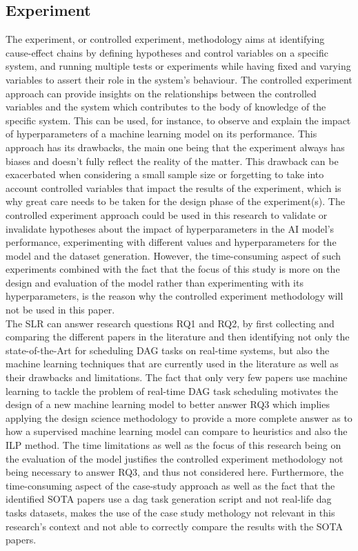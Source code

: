 \subsection{Experiment}
 
 
The experiment, or controlled experiment, methodology aims at identifying cause-effect 
chains by defining hypotheses and control variables on a specific system,
and running multiple tests or experiments while having fixed and varying variables to assert 
their role in the system's behaviour\cite{basili2007controlledExperiment}.
The controlled experiment approach 
can provide insights on the relationships between the controlled variables and the system
which contributes to the body of knowledge of the specific system.
This can be used, for instance, to observe and explain the impact of hyperparameters of a machine learning
model on its performance.
This approach has its drawbacks, the main one being 
that the experiment always has biases and doesn't fully reflect the reality
of the matter. This drawback can be exacerbated when considering 
a small sample size or forgetting
to take into account controlled variables that impact the results
of the experiment, which is why great care needs to be taken 
for the design phase of the experiment(s).
The controlled experiment approach could be used in this research to validate or invalidate hypotheses
about the impact of hyperparameters in the AI model's performance,
experimenting with different values and hyperparameters for the model and the dataset generation.
However, the time-consuming aspect of such experiments
combined with the fact that 
the focus of this study is more on the design and evaluation of the model rather than 
experimenting with its hyperparameters,
is the reason why the controlled experiment methodology will not be used in this paper.
\\

The SLR can answer research questions RQ1 and RQ2,
by first collecting and comparing the different papers in the literature
and then identifying not only the state-of-the-Art for scheduling DAG tasks on real-time systems,
but also the machine learning techniques that are currently used in the literature as well as their drawbacks and limitations.
The fact that only very few papers use machine learning to tackle the problem of real-time DAG task scheduling
motivates the design of a new machine learning model to better answer RQ3 which implies 
applying the design science methodology to provide a more complete answer as to how a supervised machine learning model 
can compare to heuristics and also the ILP method.
The time limitations as well as the focus of this research being on the evaluation of the model
justifies the controlled experiment methodology not being necessary to answer RQ3, and thus not considered here. 
Furthermore, the time-consuming aspect of the case-study approach as well as the fact that the identified SOTA papers
use a dag task generation script and not real-life dag tasks datasets, makes
the use of the case study methology not relevant in this research's context and not able to correctly compare the results with 
the SOTA papers.

